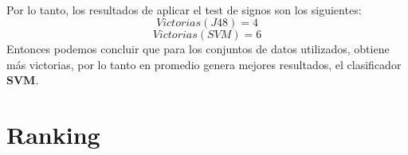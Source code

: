 \documentclass[10pt, a4paper,spanish]{article}
\begin{document}
		\paragraph{}
		Por lo tanto, los resultados de aplicar el test de signos son los siguientes:
		\[Victorias(J48) = 4\]
		\[Victorias(SVM) = 6\]
		Entonces podemos concluir que para los conjuntos de datos utilizados, obtiene más victorias, por lo tanto en promedio genera mejores resultados, el clasificador \textbf{SVM}.

	\section{Ranking}

        \paragraph{}
\end{document}

